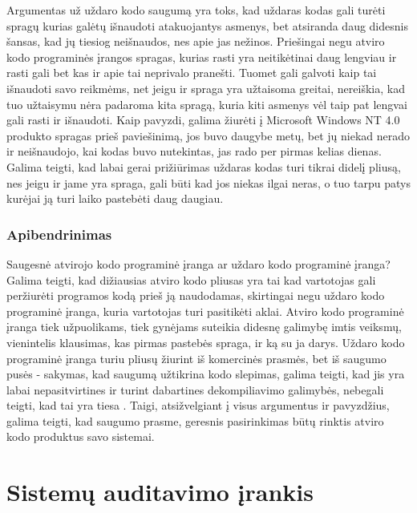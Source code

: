 \documentclass[a4paper,12pt,fleqn]{article}
\begin{document}
Argumentas už uždaro kodo saugumą yra toks, kad uždaras kodas gali turėti spragų kurias galėtų išnaudoti atakuojantys asmenys, bet atsiranda daug didesnis šansas, kad jų tiesiog neišnaudos, nes apie jas nežinos\cite{ford2007open}.  Priešingai negu atviro kodo programinės įrangos spragas, kurias rasti yra neitikėtinai daug lengviau ir rasti gali bet kas ir apie tai neprivalo pranešti. Tuomet gali galvoti kaip tai išnaudoti savo reikmėms, net jeigu ir spraga yra užtaisoma greitai, nereiškia, kad tuo užtaisymu nėra padaroma kita spragą, kuria kiti asmenys vėl taip pat lengvai gali rasti ir išnaudoti. Kaip pavyzdi, galima žiurėti į Microsoft Windows NT 4.0 produkto spragas prieš paviešinimą, jos buvo daugybe metų, bet jų niekad nerado ir neišnaudojo, kai kodas buvo nutekintas, jas rado per pirmas kelias dienas\cite{hoepman2008increased}.  Galima teigti, kad labai gerai prižiūrimas uždaras kodas turi tikrai didelį pliusą, nes jeigu ir jame yra spraga, gali būti kad jos niekas ilgai neras, o tuo tarpu patys kurėjai ją turi laiko pastebėti daug daugiau\cite{schryen2009open}.

\subsubsection{Apibendrinimas}
\label{sec:data}
Saugesnė atvirojo kodo programinė įranga ar uždaro kodo programinė įranga? Galima teigti, kad dižiausias atviro kodo pliusas yra tai kad vartotojas gali peržiurėti programos kodą prieš ją naudodamas, skirtingai negu uždaro kodo programinė įranga, kuria vartotojas turi pasitikėti aklai\cite{Cowan:2003:SSO:858866.859050}. Atviro kodo programinė įranga tiek užpuolikams, tiek gynėjams suteikia didesnę galimybę imtis veiksmų, vienintelis klausimas, kas pirmas pastebės spraga, ir ką su ja darys\cite{mishra2002quality}. Uždaro kodo programinė įranga turiu pliusų žiurint iš komercinės prasmės, bet iš saugumo pusės - sakymas, kad saugumą užtikrina kodo slepimas, galima teigti, kad jis yra labai nepasitvirtines ir turint dabartines dekompiliavimo galimybės, nebegali teigti, kad tai yra tiesa \cite{hoepman2008increased}. Taigi, atsižvelgiant į visus argumentus ir pavyzdžius, galima teigti, kad saugumo prasme, geresnis pasirinkimas būtų rinktis atviro kodo produktus savo sistemai.


\newpage
\section{Sistemų auditavimo įrankis}
\label{sec:motivation}
\end{document}
